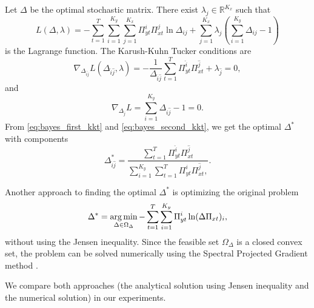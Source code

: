 Let $\Delta$ be the optimal stochastic matrix. There exist $\lambda_j \in \mathbb{R}^{K_x}$ such that
\begin{equation}
    L(\Delta, \lambda) = - \sum_{t=1}^T \sum_{i=1}^{K_y} \sum_{j=1}^{K_x} \Pi_{yt}^i \Pi_{xt}^j \ln \Delta_{ij} + \sum_{j=1}^{K_x} \lambda_j (\sum_{i=1}^{K_y} \Delta_{ij} - 1)
\end{equation}
is the Lagrange function. The Karush-Kuhn Tucker conditions are
\begin{equation}
    \nabla_{\Delta_{\hat{i}\hat{j}}} L(\Delta_{\hat{i}\hat{j}}, \lambda) = - \frac{1}{\Delta_{\hat{i}\hat{j}}} \sum_{t=1}^{T} \Pi_{yt}^{\hat{i}} \Pi_{xt}^{\hat{j}} + \lambda_{\hat{j}} = 0,
    \label{eq:bayes_first_kkt}
\end{equation}
and
\begin{equation}
    \nabla_{\Delta_{\hat{j}}} L = \sum_{i=1}^{K_y} \Delta_{i\hat{j}} - 1 = 0.
    \label{eq:bayes_second_kkt}
\end{equation}
From \eqref{eq:bayes_first_kkt} and \eqref{eq:bayes_second_kkt}, we get the optimal $\Delta^*$ with components
\begin{equation}
    \Delta_{\hat{i}\hat{j}}^{*} = \frac{\sum_{t=1}^{T} \Pi_{yt}^{\hat{i}} \Pi_{xt}^{\hat{j}}}{\sum_{i=1}^{K_y} \sum_{t=1}^{T} \Pi_{yt}^{i} \Pi_{xt}^{\hat{j}},}.
\end{equation}

Another approach to finding the optimal $\Delta^{*}$ is optimizing the original problem
\begin{equation}
    \Delta^* = \operatorname*{arg\,min}_{\Delta \in \Omega_{\Delta}} - \sum_{t=1}^T \sum_{i=1}^{K_y} \Pi_{yt}^i \ln (\Delta\Pi_{xt})_i,
\end{equation}
without using the Jensen inequality. Since the feasible set $\Omega_{\Delta}$ is a closed convex set, the problem can be solved numerically using the Spectral Projected Gradient method \cite{birgin2000}.

We compare both approaches (the analytical solution using Jensen inequality and the numerical solution) in our experiments.
